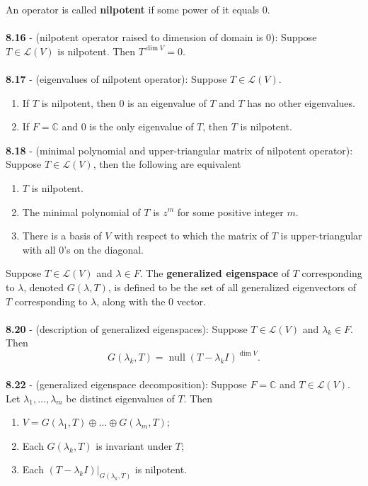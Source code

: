 \documentclass{article}
\DeclareMathOperator{\Null}{null}
\DeclareMathOperator{\Dim}{dim}
\theoremstyle{definition}
\begin{document}
An operator is called \textbf{nilpotent} if some power of it equals 0. \\ \\
\textbf{8.16} - (nilpotent operator raised to dimension of domain is 0): Suppose $T \in \mathcal{L}(V)$ is nilpotent. Then $T^{\Dim{V}} = 0$. \\ \\
\textbf{8.17} - (eigenvalues of nilpotent operator): Suppose $T \in \mathcal{L}(V)$. \begin{enumerate}
    \item If $T$ is nilpotent, then  0 is an eigenvalue of $T$ and $T$ has no other eigenvalues.
    \item If $F = \mathbb{C}$ and 0 is the only eigenvalue of $T$, then $T$ is nilpotent.
\end{enumerate} $ $ \\
\textbf{8.18} - (minimal polynomial and upper-triangular matrix of nilpotent operator): Suppose $T \in \mathcal{L}(V)$, then the following are equivalent \begin{enumerate}
    \item $T$ is nilpotent.
    \item The minimal polynomial of $T$ is $z^m$ for some positive integer $m$.
    \item There is a basis of $V$ with respect to which the matrix of $T$ is upper-triangular with all 0's on the diagonal.
\end{enumerate} $ $ \\
Suppose $T \in \mathcal{L}(V)$ and $\lambda \in F$. The \textbf{generalized eigenspace} of $T$ corresponding to $\lambda$, denoted $G(\lambda, T)$, is defined to be the set of all generalized eigenvectors of $T$ corresponding to $\lambda$, along with the 0 vector. \\ \\
\textbf{8.20} - (description of generalized eigenspaces): Suppose $T \in \mathcal{L}(V)$ and $\lambda_k \in F$. Then $$G(\lambda_k, T) = \Null{(T - \lambda_k I)^{\Dim{V}}}.$$ \\
\textbf{8.22} - (generalized eigenspace decomposition): Suppose $F = \mathbb{C}$ and $T \in \mathcal{L}(V)$. Let $\lambda_1, \dots, \lambda_m$ be distinct eigenvalues of $T$. Then \begin{enumerate}
    \item $V = G(\lambda_1, T) \oplus \dots \oplus G(\lambda_m, T)$;
    \item Each $G(\lambda_k, T)$ is invariant under $T$;
    \item Each $(T - \lambda_k I)|_{G(\lambda_k, T)}$ is nilpotent.
\end{enumerate} $ $ \\
\end{document}
